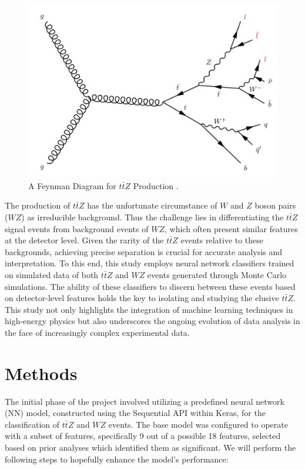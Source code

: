 \documentclass[]{article}
\begin{document}
\begin{figure}[h!]
	\centering
	\includegraphics[width=.65\linewidth]{ttZ-feinman-diagram.png}
	\caption{A Feynman Diagram for $t\bar{t}Z$ Production \cite{ttZimage}.}
\end{figure}
The production of $t\bar{t}Z$ has the unfortunate circumstance of $W$ and $Z$ boson pairs ($WZ$) as irreducible background. Thus the challenge lies in differentiating the $t\bar{t}Z$ signal events from background events of $WZ$, which often present similar features at the detector level. Given the rarity of the $t\bar{t}Z$ events relative to these backgrounds, achieving precise separation is crucial for accurate analysis and interpretation. To this end, this study employs neural network classifiers trained on simulated data of both $t\bar{t}Z$ and $WZ$ events generated through Monte Carlo simulations. The ability of these classifiers to discern between these events based on detector-level features holds the key to isolating and studying the elusive $t\bar{t}Z$. This study not only highlights the integration of machine learning techniques in high-energy physics but also underscores the ongoing evolution of data analysis in the face of increasingly complex experimental data.




\clearpage
\section{Methods}

The initial phase of the project involved utilizing a predefined neural network (NN) model, constructed using the Sequential API within Keras, for the classification of $t\bar{t}Z$ and $WZ$ events. The base model was configured to operate with a subset of features, specifically 9 out of a possible 18 features, selected based on prior analyses which identified them as significant. 
We will perform the following steps to hopefully enhance the model's performance:
\end{document}
